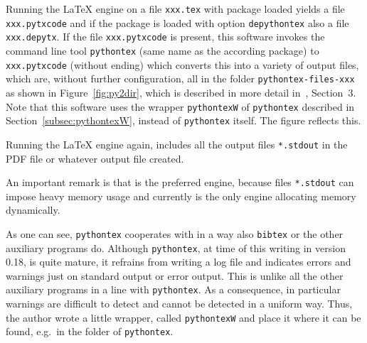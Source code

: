 Running the \LaTeX{} engine on a file \texttt{xxx.tex} 
with package  loaded 
yields a file \texttt{xxx.pytxcode} 
and if the package is loaded with option \texttt{depythontex} 
also a file \texttt{xxx.depytx}.
If the file \texttt{xxx.pytxcode} is present, 
this software invokes the command line tool \texttt{pythontex} 
(same name as the according package) 
to \texttt{xxx.pytxcode} (without ending) 
which converts this into a variety of output files, 
which are, without further configuration, 
all in the folder \texttt{pythontex-files-xxx}
as shown in Figure~\ref{fig:py2dir}, 
which is described in more detail in~\cite{PyTexInOut}, Section~3. 
Note that this software uses the wrapper \texttt{pythontexW} 
of \texttt{pythontex} described in Section~\ref{subsec:pythontexW}, 
instead of \texttt{pythontex} itself. 
The figure reflects this. 


Running the \LaTeX{} engine again, 
includes all the output files \texttt{*.stdout} 
in the PDF file or whatever output file created. 


An important remark is that \lualatex{} is the preferred engine, 
because files \texttt{*.stdout} can impose heavy memory usage 
and currently \lualatex{} is the only engine allocating memory dynamically. 

As one can see, \texttt{pythontex} cooperates with \lualatex{} in a way 
also \texttt{bibtex} or the other auxiliary programs do. 
Although \texttt{pythontex}, at time of this writing in version 0.18, 
is quite mature, it refrains from writing a log file and indicates errors and warnings 
just on standard output or error output. 
This is unlike all the other auxiliary programs in a line with \texttt{pythontex}. 
As a consequence, in particular warnings are difficult to detect 
and cannot be detected in a uniform way. 
Thus, the author wrote a little wrapper, called \texttt{pythontexW} 
and place it where it can be found, e.g.~in the folder of \texttt{pythontex}. 

